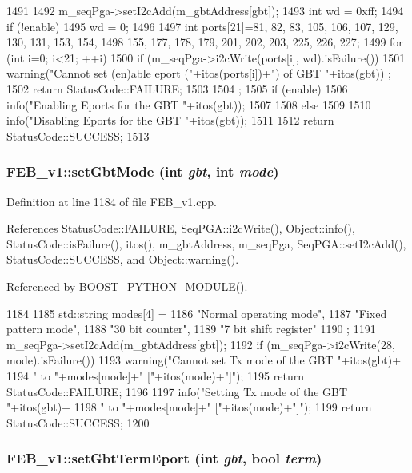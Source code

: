 \begin{DoxyCode}
1491                                                         {
1492   m_seqPga->setI2cAdd(m_gbtAddress[gbt]);
1493   int wd = 0xff;
1494   if (!enable){
1495     wd = 0;
1496   }
1497   int ports[21]={81, 82, 83, 105, 106, 107, 129, 130, 131, 153, 154,
1498          155, 177, 178, 179, 201, 202, 203, 225, 226, 227};
1499   for (int i=0; i<21; ++i){
1500     if (m_seqPga->i2cWrite(ports[i], wd).isFailure()){
1501       warning("Cannot set (en)able eport ("+itos(ports[i])+") of GBT "+itos(gbt))
      ;
1502       return StatusCode::FAILURE;
1503     }
1504   };
1505   if (enable){
1506     info("Enabling Eports for the GBT "+itos(gbt));
1507   }
1508   else
1509   {
1510     info("Disabling Eports for the GBT "+itos(gbt));
1511   }
1512   return StatusCode::SUCCESS;
1513 }
\end{DoxyCode}
\hypertarget{classFEB__v1_a849040ff2fa8275b1a47e7be3915ebf4}{
\subsubsection[{setGbtMode}]{ FEB\_\-v1::setGbtMode (int {\em gbt}, \/  int {\em mode})}}
\label{classFEB__v1_a849040ff2fa8275b1a47e7be3915ebf4}


Definition at line 1184 of file FEB\_\-v1.cpp.

References StatusCode::FAILURE, SeqPGA::i2cWrite(), Object::info(), StatusCode::isFailure(), itos(), m\_\-gbtAddress, m\_\-seqPga, SeqPGA::setI2cAdd(), StatusCode::SUCCESS, and Object::warning().

Referenced by BOOST\_\-PYTHON\_\-MODULE().


\begin{DoxyCode}
1184                                                {
1185   std::string modes[4] = {
1186     "Normal operating mode",
1187     "Fixed pattern mode",
1188     "30 bit counter",
1189     "7 bit shift register"
1190   };
1191   m_seqPga->setI2cAdd(m_gbtAddress[gbt]);
1192   if (m_seqPga->i2cWrite(28, mode).isFailure()){
1193     warning("Cannot set Tx mode of the GBT "+itos(gbt)+
1194      " to "+modes[mode]+" ["+itos(mode)+"]");
1195     return StatusCode::FAILURE;
1196   }
1197   info("Setting Tx mode of the GBT "+itos(gbt)+
1198        " to "+modes[mode]+" ["+itos(mode)+"]");
1199   return StatusCode::SUCCESS;  
1200 }
\end{DoxyCode}
\hypertarget{classFEB__v1_ab7c261039c872c9f039fb7366a84d271}{
\subsubsection[{setGbtTermEport}]{ FEB\_\-v1::setGbtTermEport (int {\em gbt}, \/  bool {\em term})}}
\label{classFEB__v1_ab7c261039c872c9f039fb7366a84d271}


